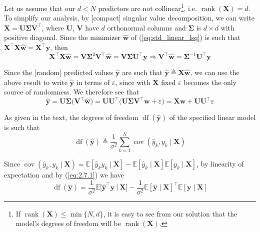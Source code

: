 \documentclass{article}
\numberwithin{equation}{section}
\begin{document}
Let us assume that our $ d < N $ predictors are not collinear\footnote{
    If $ \operatorname{rank}(\mathbf{X}) \le \min\{N, d\} $, it is easy to
    see from our solution that the model's degrees of freedom will be
    $ \operatorname{rank}(\mathbf{X}) $.
}, i.e. $ \operatorname{rank}(\mathbf{X}) = d $. To simplify our analysis,
by [compact] singular value decomposition, we can write $ \mathbf{X} =
\mathbf{U\Sigma V}^\top $, where $ \mathbf{U} $, $ \mathbf{V} $ have $ d $
orthonormal columns and $ \mathbf{\Sigma} $ is $ d \times d $ with positive
diagonal. Since the minimizer $ \hat{\mathbf{w}} $ of
(\ref{eq:std_linear_lsq}) is such that $ \mathbf{X}^\top\mathbf{X}
\hat{\mathbf{w}} = \mathbf{X}^\top\mathbf{y} $, then
\begin{equation*}
    \mathbf{X}^\top\mathbf{X}\hat{\mathbf{w}} =
    \mathbf{V\Sigma}^2\mathbf{V}^\top\hat{\mathbf{w}} =
    \mathbf{V\Sigma U}^\top\mathbf{y} \Rightarrow
    \mathbf{V}^\top\hat{\mathbf{w}} =
    \mathbf{\Sigma}^{-1}\mathbf{U}^\top\mathbf{y}
\end{equation*}

Since the [random] predicted values $ \hat{\mathbf{y}} $ are such that
$ \hat{\mathbf{y}} \triangleq \mathbf{X}\hat{\mathbf{w}} $, we can use the
above result to write $ \hat{\mathbf{y}} $ in terms of $ \varepsilon $,
since with $ \mathbf{X} $ fixed $ \varepsilon $ becomes the only source of
randomness. We therefore see that
\begin{equation} \label{eq:2.7.1}
    \hat{\mathbf{y}} =
    \mathbf{U\Sigma}\big(\mathbf{V}^\top\hat{\mathbf{w}}\big) =
    \mathbf{UU}^\top\big(
        \mathbf{U\Sigma V}^\top\mathbf{w} + \varepsilon
    \big) = \mathbf{Xw} + \mathbf{UU}^\top\varepsilon
\end{equation}

As given in the text, the degrees of freedom $ \operatorname{df}(
\hat{\mathbf{y}}) $ of the specified linear model is such that
\begin{equation*}
    \operatorname{df}(\hat{\mathbf{y}}) \triangleq
    \frac{1}{\sigma^2}\sum_{k = 1}^N
    \operatorname{cov}(\hat{y}_k, y_k \mid \mathbf{X})
\end{equation*}

Since $ \operatorname{cov}(\hat{y}_k, y_k \mid \mathbf{X}) =
\mathbb{E}[\hat{y}_ky_k \mid \mathbf{X}] -
\mathbb{E}[\hat{y}_k \mid \mathbf{X}]\mathbb{E}[y_k \mid \mathbf{X}] $, by
linearity of expectation and by (\ref{eq:2.7.1}) we have
\begin{equation} \label{eq:2.7.2}
    \operatorname{df}(\hat{\mathbf{y}}) =
    \frac{1}{\sigma^2}
    \mathbb{E}\big[\hat{\mathbf{y}}^\top\mathbf{y} \ \big| \ \mathbf{X}\big] -
	\frac{1}{\sigma^2}\mathbb{E}[\hat{\mathbf{y}} \mid \mathbf{X}]^\top
    \mathbb{E}[\mathbf{y} \mid \mathbf{X}]
\end{equation}
\end{document}
